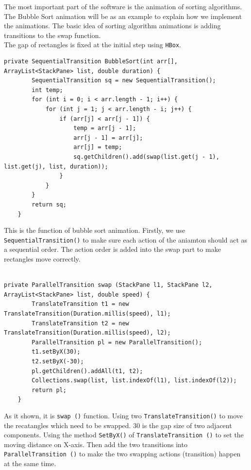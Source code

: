 \documentclass[paper=a4, fontsize=11pt,twoside]{scrartcl}		%
\begin{document}
The most important part of the software is the animation of sorting algorithms. The Bubble Sort animation will be as an example to explain how we implement the animations. The basic idea of sorting algorithm animations is adding transitions to the swap function.\\

The gap of rectangles is fixed at the initial step using \texttt{HBox}.

\begin{lstlisting}
private SequentialTransition BubbleSort(int arr[], ArrayList<StackPane> list, double duration) {
        SequentialTransition sq = new SequentialTransition();
        int temp;
        for (int i = 0; i < arr.length - 1; i++) {
            for (int j = 1; j < arr.length - i; j++) {
                if (arr[j] < arr[j - 1]) {
                    temp = arr[j - 1];
                    arr[j - 1] = arr[j];
                    arr[j] = temp;
                    sq.getChildren().add(swap(list.get(j - 1), list.get(j), list, duration));
                }
            }
        }
        return sq;
    }

\end{lstlisting}

This is the function of bubble sort animation. Firstly, we use \texttt{SequentialTransition()} to make sure each action of the aniamton should act as a sequential order. The action order is added into the swap part to make rectangles move correctly. \\\\


\begin{lstlisting}
private ParallelTransition swap (StackPane l1, StackPane l2, ArrayList<StackPane> list, double speed) {
        TranslateTransition t1 = new TranslateTransition(Duration.millis(speed), l1);
        TranslateTransition t2 = new TranslateTransition(Duration.millis(speed), l2);
        ParallelTransition pl = new ParallelTransition();
        t1.setByX(30);
        t2.setByX(-30);
        pl.getChildren().addAll(t1, t2);
        Collections.swap(list, list.indexOf(l1), list.indexOf(l2));
        return pl;
    }

\end{lstlisting}

As it shown, it is \texttt{swap ()} function. Using two \texttt{TranslateTransition()} to move the recatangles which need to be swapped. 30 is the gap size of two adjacent components. Using the method \texttt{SetByX()} of \texttt{TranslateTransition ()} to set the moving distance on X-axis. Then add the two transitions into \texttt{ParallelTransition ()} to make the two swapping actions (transition) happen at the same time. 
\end{document}
